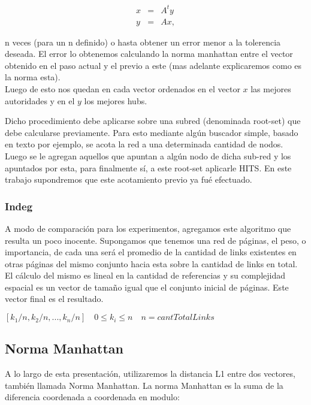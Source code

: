 \begin{eqnarray}
x & = & A^ty \label{eq:auth-update-math} \\
y & = & Ax, \label{eq:hub-update-math} 
\end{eqnarray}

n veces (para un n definido) o hasta obtener un error menor a la tolerencia deseada. El error lo obtenemos calculando la norma manhattan entre el vector obtenido en el paso actual y el previo a este (mas adelante explicaremos como es la norma esta).\\
Luego de esto nos quedan en cada vector ordenados en el vector $x$ las mejores autoridades y en el $y$ los mejores hubs.

Dicho procedimiento debe aplicarse sobre una subred (denominada root-set) que debe calcularse previamente. Para esto mediante algún buscador simple, basado en texto por ejemplo, se acota la red a una determinada cantidad de nodos. Luego se le agregan aquellos que apuntan a algún nodo de dicha sub-red y los apuntados por esta, para finalmente sí, a este root-set aplicarle HITS. En este trabajo supondremos que este acotamiento previo ya fué efectuado.


\subsubsection{Indeg}
A modo de comparación para los experimentos, agregamos este algoritmo que resulta un poco inocente. Supongamos que tenemos una red de páginas, el peso, o importancia, de cada una será el promedio de la cantidad de links existentes en otras páginas del mismo conjunto hacia esta sobre la cantidad de links en total. El cálculo del mismo es lineal en la cantidad de referencias y su complejidad espacial es un vector de tamaño igual que el conjunto inicial de páginas. Este vector final es el resultado.

\begin{center}
$[k_1/n, k_2/n, ..., k_n/n]\quad 0 \leq k_i \leq n \quad n = cantTotalLinks$
\end{center}

\subsection{Norma Manhattan}

A lo largo de esta presentación, utilizaremos la distancia L1 entre dos vectores, también llamada Norma Manhattan.
La norma Manhattan es la suma de la diferencia coordenada a coordenada en modulo:

